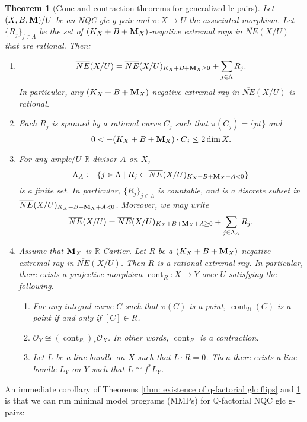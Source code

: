 \documentclass[11pt]{amsart}
\numberwithin{equation}{section}
\newcommand{\Mm}{{\bf{M}}}
\newcommand{\Qq}{\mathbb{Q}}
\newcommand{\Rr}{\mathbb{R}}
\newcommand{\cont}{\operatorname{cont}}
\newtheorem{thm}{Theorem}[section]
\theoremstyle{definition}
\theoremstyle{definition}
\theoremstyle{definition}
\begin{document}
\begin{thm}[Cone and contraction theorems for generalized lc pairs]\label{thm: cone and contraction theorem glc pair}
Let $(X,B,\Mm)/U$ be an NQC glc g-pair and $\pi: X\rightarrow U$ the associated morphism. Let $\{R_j\}_{j\in\Lambda}$ be the set of $(K_X+B+\Mm_X)$-negative extremal rays in $\overline{NE}(X/U)$ that are rational. Then:
\begin{enumerate}
    \item $$\overline{NE}(X/U)=\overline{NE}(X/U)_{K_X+B+\Mm_X\geq 0}+\sum_{j\in\Lambda} R_j.$$
    In particular, any $(K_X+B+\Mm_X)$-negative extremal ray in $\overline{NE}(X/U)$ is rational.
    \item Each $R_j$ is spanned by a rational curve $C_j$ such that $\pi(C_j)=\{pt\}$ and 
    $$0<-(K_X+B+\Mm_X)\cdot C_j\leq 2\dim X.$$
    \item For any ample$/U$ $\Rr$-divisor $A$ on $X$,
    $$\Lambda_A:=\{j\in\Lambda\mid R_j\subset\overline{NE}(X/U)_{K_X+B+\Mm_X+A<0}\}$$
    is a finite set. In particular, $\{R_j\}_{j\in\Lambda}$ is countable, and is a discrete subset in $\overline{NE}(X/U)_{K_X+B+\Mm_X+A<0}$. Moreover, we may write
    $$\overline{NE}(X/U)=\overline{NE}(X/U)_{K_X+B+\Mm_X+A\geq 0}+\sum_{j\in\Lambda_A}R_j.$$
    \item Assume that $\Mm_X$ is $\Rr$-Cartier. Let $R$ be a $(K_X+B+\Mm_X)$-negative extremal ray in $\overline{NE}(X/U)$. Then $R$ is a rational extremal ray. In particular, there exists a projective morphism $\cont_R: X\rightarrow Y$ over $U$ satisfying the following.
    \begin{enumerate}
        \item For any integral curve $C$ such that $\pi(C)$ is a point, $\cont_R(C)$ is a point if and only if $[C]\in R$.
        \item $\mathcal{O}_Y\cong(\cont_R)_*\mathcal{O}_X$. In other words, $\cont_R$ is a contraction.
        \item Let $L$ be a line bundle on $X$ such that $L\cdot R=0$. Then there exists a line bundle $L_Y$ on $Y$ such that $L\cong f^*L_Y$.
    \end{enumerate}
\end{enumerate}
\end{thm}

An immediate corollary of Theorems \ref{thm: existence of q-factorial glc flips} and \ref{thm: cone and contraction theorem glc pair} is that we can run minimal model programs (MMPs) for $\Qq$-factorial NQC glc g-pairs:
\end{document}

